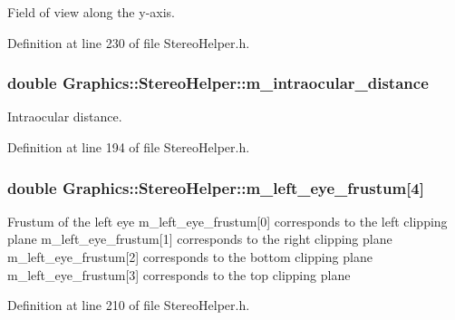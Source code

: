 Field of view along the y-\/axis. 



Definition at line 230 of file StereoHelper.h.

\hypertarget{class_graphics_1_1_stereo_helper_a13736b824aee087d5a8bc948f8bc700d}{
\subsubsection[{m\_\-intraocular\_\-distance}]{\setlength{\rightskip}{0pt plus 5cm}double {\bf Graphics::StereoHelper::m\_\-intraocular\_\-distance}}}
\label{class_graphics_1_1_stereo_helper_a13736b824aee087d5a8bc948f8bc700d}


Intraocular distance. 



Definition at line 194 of file StereoHelper.h.

\hypertarget{class_graphics_1_1_stereo_helper_a912a430f01899bb0e2ebeec941dc6801}{
\subsubsection[{m\_\-left\_\-eye\_\-frustum}]{\setlength{\rightskip}{0pt plus 5cm}double {\bf Graphics::StereoHelper::m\_\-left\_\-eye\_\-frustum}\mbox{[}4\mbox{]}}}
\label{class_graphics_1_1_stereo_helper_a912a430f01899bb0e2ebeec941dc6801}
Frustum of the left eye m\_\-left\_\-eye\_\-frustum\mbox{[}0\mbox{]} corresponds to the left clipping plane m\_\-left\_\-eye\_\-frustum\mbox{[}1\mbox{]} corresponds to the right clipping plane m\_\-left\_\-eye\_\-frustum\mbox{[}2\mbox{]} corresponds to the bottom clipping plane m\_\-left\_\-eye\_\-frustum\mbox{[}3\mbox{]} corresponds to the top clipping plane 

Definition at line 210 of file StereoHelper.h.

